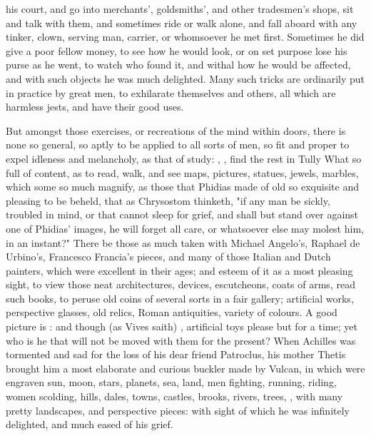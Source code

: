 {his court, and go into merchants', goldsmiths', and other tradesmen's shops, sit and talk with them, and sometimes ride or walk alone, and fall aboard with any tinker, clown, serving man, carrier, or whomsoever he met first. Sometimes he did  give a poor fellow money, to see how he would look, or on set purpose lose his purse as he went, to watch who found it, and withal how he would be affected, and with such objects he was much delighted. Many such tricks are ordinarily put in practice by great men, to exhilarate themselves and others, all which are harmless jests, and have their good uses.

But amongst those exercises, or recreations of the mind within doors, there is none so general, so aptly to be applied to all sorts of men, so fit and proper to expel idleness and melancholy, as that of study: , \etc{}, find the rest in Tully  What so full of content, as to read, walk, and see maps, pictures, statues, jewels, marbles, which some so much magnify, as those that Phidias made of old so exquisite and pleasing to be beheld, that as Chrysostom thinketh, "if any man be sickly, troubled in mind, or that cannot sleep for grief, and shall but stand over against one of Phidias' images, he will forget all care, or whatsoever else may molest him, in an instant?" There be those as much taken with Michael Angelo's, Raphael de Urbino's, Francesco Francia's pieces, and many of those Italian and Dutch painters, which were excellent in their ages; and esteem of it as a most pleasing sight, to view those neat architectures, devices, escutcheons, coats of arms, read such books, to peruse old coins of several sorts in a fair gallery; artificial works, perspective glasses, old relics, Roman antiquities, variety of colours. A good picture is : and though (as Vives saith) , artificial toys please but for a time; yet who is he that will not be moved with them for the present? When Achilles was tormented and sad for the loss of his dear friend Patroclus, his mother Thetis brought him a most elaborate and curious buckler made by Vulcan, in which were engraven sun, moon, stars, planets, sea, land, men fighting, running, riding, women scolding, hills, dales, towns, castles, brooks, rivers, trees, \etc{}, with many pretty landscapes, and perspective pieces: with sight of which he was infinitely delighted, and much eased of his grief.

}
